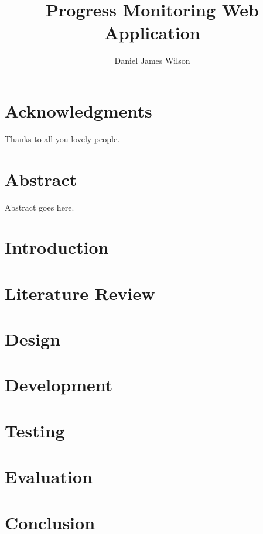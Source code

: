 \documentclass[titlepage,a4paper,11pt,oneside]{book} %
\author{Daniel James Wilson}
\title{Progress Monitoring Web Application}
\begin{document}
\frontmatter
\maketitle

\chapter{Acknowledgments}
Thanks to all you lovely people.

\chapter{Abstract}
Abstract goes here.

\tableofcontents
\listoffigures


\mainmatter
\chapter{Introduction}
\label{sec:mainIntro}


\chapter{Literature Review}
\label{sec:litRev}


\chapter{Design}
\label{sec:design}


\chapter{Development}
\label{sec:dev}


\chapter{Testing}
\label{sec:test}


\chapter{Evaluation}
\label{sec:eval}


\chapter{Conclusion}
\label{sec:conc}


\pagebreak

\end{document}
